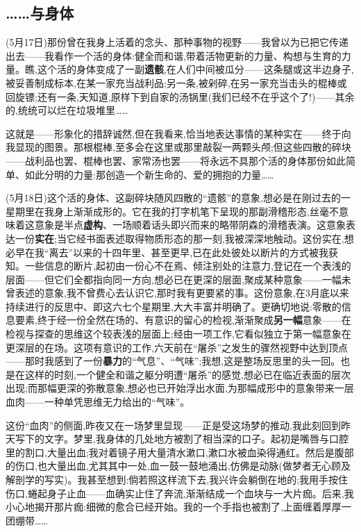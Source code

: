 \subsection{……与身体}


(5月17日)那份曾在我身上活着的念头、那种事物的视野——我曾以为已把它传递出去——我看作一个活的身体:健全而和谐,带着活物更新的力量、构想与生育的力量。瞧,这个活的身体变成了一副\textbf{遗骸},在人们中间被瓜分——这条腿或这半边身子,被妥善制成标本,在某一家充当战利品;另一条,被剁碎,在另一家充当击头的棍棒或回旋镖;还有一条,天知道,原样下到自家的汤锅里(我们已经不在乎这个了!)——其余的,统统可以烂在垃圾堆里……

这就是——形象化的措辞诚然,但在我看来,恰当地表达事情的某种实在——终于向我显现的图景。那根棍棒,至多会在这里或那里敲裂一两颗头颅;但这些四散的碎块——战利品也罢、棍棒也罢、家常汤也罢——将永远不具那个活的身体那份如此简单、如此分明的力量:那创造一个新生命的、爱的拥抱的力量……

(5月18日)这个活的身体、这副碎块随风四散的“遗骸”的意象,想必是在刚过去的一星期里在我身上渐渐成形的。\dmark{}它在我的打字机笔下呈现的那副滑稽形态,丝毫不意味着这意象是半点\textbf{虚构}、一场顺着话头即兴而来的略带阴森的滑稽表演。这意象表达一份\textbf{实在};当它经书面表述取得物质形态的那一刻,我被深深地触动。这份实在,想必早在我“离去”以来的十四年里、甚至更早,已在此处彼处以断片的方式被我获知。一些信息的断片,起初由一份心不在焉、倾注别处的注意力,登记在一个表浅的层面——但它们全都指向同一方向,想必已在更深的层面,聚成某种意象——一幅未曾表述的意象,我不曾费心去认识它,那时我有更要紧的事。这份意象,在3月底以来持续进行的反思中、即这六七个星期里,大大丰富并明确了。更确切地说:零散的信息要素,终于经一份全然在场的、有意识的留心的检视,渐渐聚成\textbf{另一幅}意象——在检视与探查的思维这个较表浅的层面上;经由一项工作,它看似独立于第一幅意象在更深层的在场。这项有意识的工作,六天前在“屠杀”之发生的骤然视野中达到顶点——那时我感到了一份\textbf{暴力}的“气息”、“气味”;我想,这是整场反思里的头一回。也是在这样的时刻,一个健全和谐之躯分明遭“屠杀”的感觉,想必已在临近表面的层次出现;而那幅更深的弥散意象,想必也已开始浮出水面,为那幅成形中的意象带来一层血肉——一种单凭思维无力给出的“气味”。

这份“血肉”的侧面,昨夜又在一场梦里显现——正是受这场梦的推动,我此刻回到昨天写下的文字。梦里,我身体的几处地方被割了相当深的口子。起初是嘴唇与口腔里的割口,大量出血;我对着镜子用大量清水漱口,漱口水被血染得通红。然后是腹部的伤口,也大量出血,尤其其中一处,血一鼓一鼓地涌出,仿佛是动脉(做梦者无心顾及解剖学的写实)。我甚至想到:倘若照这样流下去,我兴许会躺倒在地的;我用手按住伤口,蜷起身子止血——血确实止住了奔流,渐渐结成一个血块与一大片痂。后来,我小心地揭开那片痂:细微的愈合已经开始。我的一个手指也被割了,上面缠着厚厚一团绷带……

